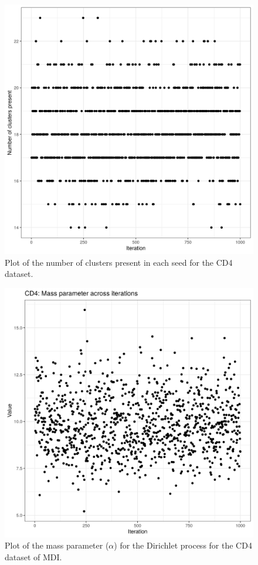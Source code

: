 \documentclass[12pt]{article} %
\begin{document}
	
	\begin{figure}[h]
		\centering
		\includegraphics[scale=0.75]{Images/Biology_data/Set_1000/All_datasets/Cluster_series_plots/CD4.png}
		\caption{Plot of the number of clusters present in each seed for the CD4 dataset.}
		\label{fig:results:cedar_2:mdi_cd4_number_clusters_plot}
	\end{figure}
	
	
	\begin{figure}[h]
		\centering
		\includegraphics[scale=0.75]{Images/Biology_data/Set_1000/All_datasets/Mass_parameter_plots/CD4.png}
		\caption{Plot of the mass parameter ($\alpha$) for the Dirichlet process for the CD4 dataset of MDI.}
		\label{fig:results:cedar_2:mdi_cd4_mass_parameter_plot}
	\end{figure}
	
\end{document}
